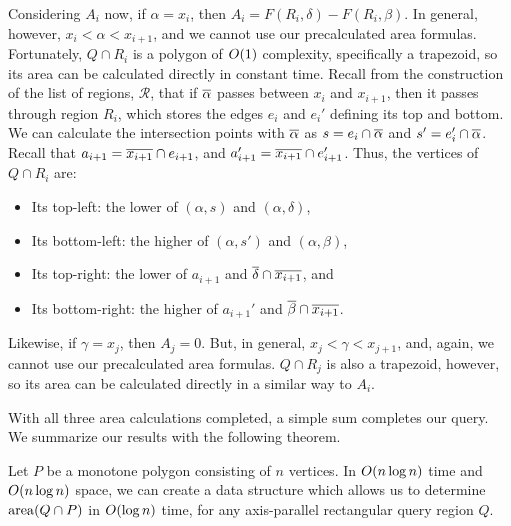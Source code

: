 Considering $A_i$ now, if $\alpha = x_i$, then $A_i = F(R_i, \delta) - F(R_i, 
\beta)$. 
In general, however, $x_i < \alpha < x_{i+1}$, and we cannot use our 
precalculated area formulas.
Fortunately, $Q \cap R_i$ is a polygon of $O\!\left(1\right)$ complexity, specifically a 
trapezoid, so its area can be calculated directly in constant time. 
Recall from the construction of the list of regions, $\mathcal{R}$, that if 
$\overline{\alpha}$ passes between $x_i$ and $x_{i+1}$, then it passes through 
region $R_i$, which stores the edges $e_i$ and $e_i'$ defining its top and 
bottom. 
We can calculate the intersection points with $\overline{\alpha}$ as $s = e_i \cap 
\overline{\alpha}$ and $s' = e_i' \cap \overline{\alpha}$.
Recall that $a_{i+1} = \overline{x_{i+1}} \cap e_{i+1}$, and $a_{i+1}' = 
\overline{x_{i+1}} \cap e_{i+1}'$.
Thus, the vertices of $Q \cap R_i$ are:
\begin{itemize}
 \item Its top-left: the lower of $(\alpha, s)$ and $(\alpha, \delta)$,

 \item Its bottom-left: the higher of $(\alpha, s')$ and $(\alpha, \beta)$,

 \item Its top-right: the lower of $a_{i+1}$ and $\overline{\delta} \cap 
\overline{x_{i+1}}$, and

 \item Its bottom-right: the higher of $a_{i+1}'$ and $\overline{\beta} \cap 
\overline{x_{i+1}}$.

\end{itemize}

Likewise, if $\gamma = x_j$, then $A_j = 0$. But, in general, $x_j < \gamma < 
x_{j+1}$, and, again, we cannot use our precalculated area formulas.
$Q \cap R_j$ is also a trapezoid, however, so its area can be calculated 
directly in a similar way to $A_i$.

With all three area calculations completed, a simple sum completes our query. We 
summarize our results with the following theorem.

\begin{theorem}
\label{th:monotonep:rect:area}
Let $P$ be a monotone polygon consisting of $n$ vertices. 
In $O\!\left(n \log{n}\right)$ time and $O\!\left(n \log{n}\right)$ space, we can create a data 
structure which allows us to determine $\operatorname{area}\!\left(Q \cap P\right)$ in $O\!\left(\log{n}\right)$ 
time, for any axis-parallel rectangular query region $Q$.
\end{theorem}


